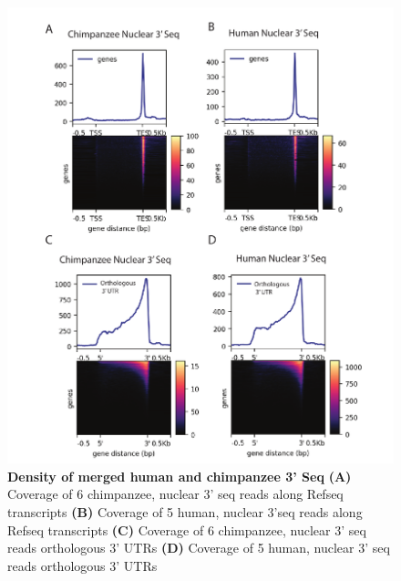 \begin{figure}[!htb]
\centering
\includegraphics[width=5in]{img/ch03/Fig1-figSup1.pdf}
\caption[Density of merged human and chimpanzee 3' Seq]{\textbf{Density of merged human and chimpanzee 3' Seq} {\bf (A)}  Coverage of 6 chimpanzee, nuclear 3' seq reads along Refseq transcripts {\bf (B)}  Coverage of 5 human, nuclear 3'seq reads along Refseq transcripts {\bf (C)}  Coverage of 6 chimpanzee, nuclear 3' seq reads orthologous 3' UTRs {\bf (D)} Coverage of 5 human, nuclear 3' seq reads orthologous 3' UTRs}
\label{fig:ch03-deeptools}
\end{figure}
\clearpage


